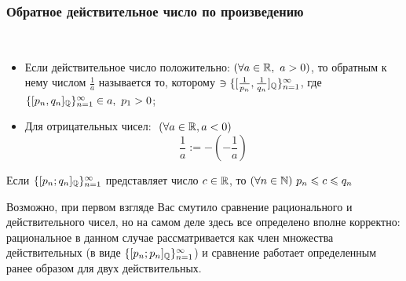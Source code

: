 \subsubsection*{Обратное действительное число по произведению}

\begin{definition}~

    \begin{itemize}
        \item Если действительное число положительно:
            $(\forall a \in \mathbb{R},\ a > 0)$, то обратным к нему
            числом $\frac{1}{a}$ называется то, которому
            $\ni \{[\frac{1}{p_n}, \frac{1}{q_n}]
            _{\mathbb{Q}}\}_{n = 1}^{\infty}$, где
            $\{[p_n, q_n]_{\mathbb{Q}}\}_{n = 1}^{\infty} \in a, \ p_1 > 0$; 
        \item Для отрицательных чисел:
            $\ (\forall a \in \mathbb{R}, a < 0)$
            \[
                \frac{1}{a} := -(-\frac{1}{a})
            \]
    \end{itemize}
\end{definition}

\begin{lemma}
    Если $\{[p_n; q_n]_{\mathbb{Q}}\}_{n = 1}^\infty$ представляет
    число $c \in \mathbb{R}$, то $(\forall n \in \mathbb{N})\ p_n \leqslant c \leqslant q_n$
\end{lemma}

\begin{anote}
    Возможно, при первом взгляде Вас смутило сравнение
    рационального и действительного чисел, но на самом деле здесь
    все определено вполне корректно: рациональное в данном случае
    рассматривается как член множества действительных (в виде
    $\{[p_n; p_n]_{\mathbb{Q}}\}_{n = 1}^\infty$) и сравнение работает
    определенным ранее образом для двух действительных.
\end{anote}

